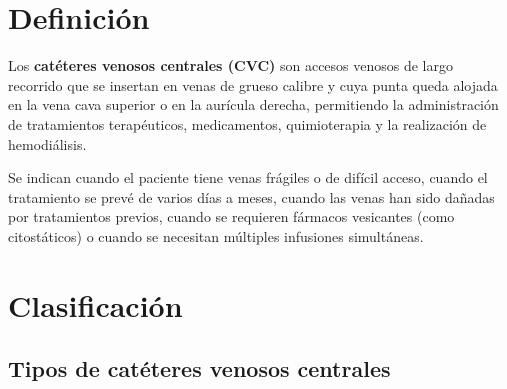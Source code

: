 \section*{Definición}

\begin{cajadefinicion}
	Los \textbf{catéteres venosos centrales (CVC)} son accesos venosos de largo recorrido que se insertan en venas de grueso calibre y cuya punta queda alojada en la vena cava superior o en la aurícula derecha, permitiendo la administración de tratamientos terapéuticos, medicamentos, quimioterapia y la realización de hemodiálisis.
\end{cajadefinicion}

Se indican cuando el paciente tiene venas frágiles o de difícil acceso, cuando el tratamiento se prevé de varios días a meses, cuando las venas han sido dañadas por tratamientos previos, cuando se requieren fármacos vesicantes (como citostáticos) o cuando se necesitan múltiples infusiones simultáneas.

\clearpage
\section*{Clasificación}

\subsection*{Tipos de catéteres venosos centrales}

